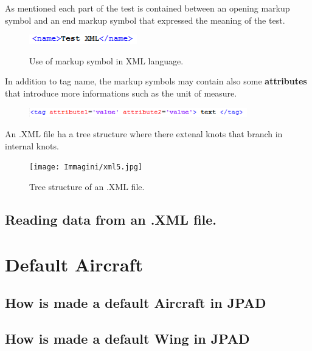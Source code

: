 As mentioned each part of the test is contained between an opening {\bfseres markup symbol} and an end markup symbol that expressed the meaning of the test.\\

\begin{figure}[H]
\centering
{\includegraphics[height=0.39cm]{Immagini/xml1.jpg}} 
\caption{Use of markup symbol in XML language.}
\end{figure}

In addition to tag name, the markup symbols may contain also some {\bfseries attributes} that introduce more informations such as the unit of measure.\\

\begin{figure}[H]
\centering
{\includegraphics[height=0.4cm]{Immagini/xml2.jpg}} 
\end{figure}

An .XML file ha a tree structure where there extenal knots that branch in internal knots.


\begin{figure}[H]
\centering
{\texttt{[image: Immagini/xml5.jpg]}} 
\caption{Tree structure of an .XML file.}
\end{figure}

\subsection{Reading data from an .XML file.}

\section {Default Aircraft}
\subsection {How is made a default Aircraft in JPAD}

\subsection {How is made a default Wing in JPAD}

